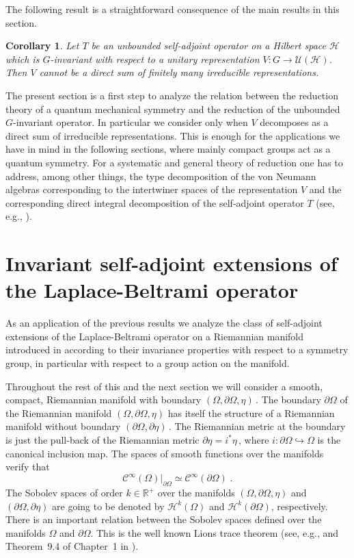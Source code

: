 \documentclass[a4paper,12pt]{amsart}
\renewcommand{\H}{\mathcal{H}}
\newcommand{\pO}{{\partial \Omega}}
\newcommand{\C}{\mathcal{C}}
\newcommand{\1}{\mathbb{I}}
\newtheorem{corollary}[theorem]{Corollary}
\numberwithin{equation}{section}
\numberwithin{theorem}{section}
\begin{document}
The following result is a straightforward consequence of the main results in this section.

\begin{corollary}
Let $T$ be an unbounded self-adjoint operator on a Hilbert space $\mathcal H$ which is $G$-invariant with respect to 
a unitary representation $V\colon G\to\mathcal{U}(\mathcal{H})$. Then $V$ cannot be a direct sum of finitely many irreducible 
representations.
\end{corollary}


The present section is a first step to analyze the relation between the reduction theory of a quantum mechanical symmetry
and the reduction of the unbounded $G$-invariant operator. 
In particular we consider only when $V$ decomposes as a direct
sum of irreducible representations. This is enough for the applications we have in mind in the following sections, where mainly 
compact groups act as a quantum symmetry. For a systematic and general theory of reduction one has to address, among other things,
the type decomposition of the von Neumann algebras corresponding to the intertwiner spaces of the representation $V$ and 
the corresponding direct integral decomposition of the self-adjoint operator
$T$ (see, e.g., \cite{Nussbaum64,Mackey76}). 



\section{Invariant self-adjoint extensions of the Laplace-Beltrami operator}
\label{sec:InvariantLB}

As an application of the previous results we analyze the class of self-adjoint extensions
of the Laplace-Beltrami operator on a Riemannian manifold introduced in \cite{ILP13} according to their
invariance properties with respect to a symmetry group, in particular with respect to a group action on the manifold. 

Throughout the rest of this and the next section we will consider a smooth, compact, Riemannian manifold with boundary $(\Omega,\pO,\eta)$\,. 
The boundary $\pO$ of the Riemannian manifold $(\Omega,\pO,\eta)$ has itself the structure of a Riemannian manifold without 
boundary $(\pO,\partial\eta)$\,.  The Riemannian metric at the boundary is just the pull-back of the Riemannian metric $\partial\eta=i^*\eta$\,, 
where $i:\pO\hookrightarrow\Omega$ is the canonical inclusion map. The spaces of smooth functions over the manifolds verify that 
$$\C^\infty(\Omega)\bigr|_{\pO}\simeq\C^\infty(\pO)\;.$$
The Sobolev spaces of order $k\in\mathbb{R}^+$ over the manifolds $(\Omega,\pO,\eta)$ and $(\pO,\partial\eta)$ are going 
to be denoted by $\H^k(\Omega)$ and $\H^k(\pO)$, respectively. There is an important relation between the Sobolev spaces 
defined over the manifolds $\Omega$ and $\pO$. This is the well known Lions trace theorem (see, e.g., \cite[Theorem 7.39]{adams03} and 
Theorem~9.4 of Chapter~1 in \cite{lions72}).
\end{document}
